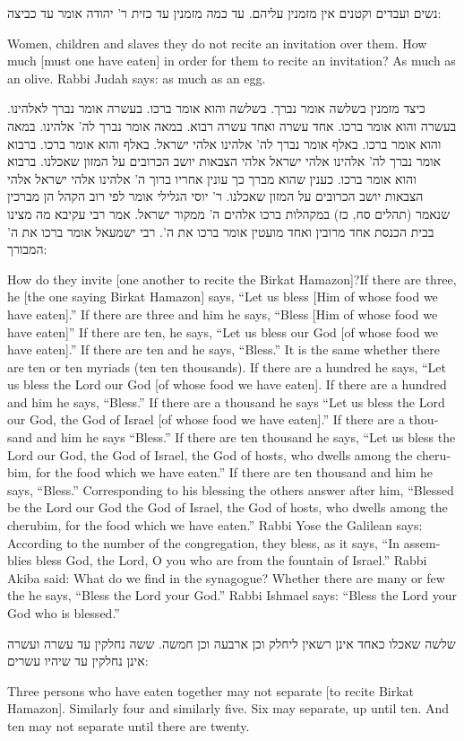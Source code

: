 \documentclass[12pt, openany]{book}
\newcommand{\textblock}[2]{
	{\fontsize{16pt}{20pt}\selectfont #1\\}
	
	\begin{english}
		#2
	\end{english}
	\clearpage
}
\begin{document}
\textblock{נשים ועבדים וקטנים אין מזמנין עליהם. עד כמה מזמנין עד כזית ר' יהודה אומר עד כביצה: }{Women, children and slaves they do not recite an invitation over them. How much {[must one have eaten]} in order for them to recite an invitation? As much as an olive. Rabbi Judah says:  as much as an egg.}
\textblock{כיצד מזמנין בשלשה אומר נברך. בשלשה והוא אומר ברכו. בעשרה אומר נברך לאלהינו. בעשרה והוא אומר ברכו. אחד עשרה ואחד עשרה רבוא. במאה אומר נברך לה' אלהינו. במאה והוא אומר ברכו. באלף אומר נברך לה' אלהינו אלהי ישראל. באלף והוא אומר ברכו. ברבוא אומר נברך לה' אלהינו אלהי ישראל אלהי הצבאות יושב הכרובים על המזון שאכלנו. ברבוא והוא אומר ברכו. כענין שהוא מברך כך עונין אחריו ברוך ה' אלהינו אלהי ישראל אלהי הצבאות יושב הכרובים על המזון שאכלנו. ר' יוסי הגלילי אומר לפי רוב הקהל הן מברכין שנאמר (תהלים סח, כז) במקהלות ברכו אלהים ה' ממקור ישראל. אמר רבי עקיבא מה מצינו בבית הכנסת אחד מרובין ואחד מועטין אומר ברכו את ה'. רבי ישמעאל אומר ברכו את ה' המבורך: }{How do they invite {[one another to recite the Birkat Hamazon]}?If there are three, he {[the one saying Birkat Hamazon]} says, “Let us bless {[Him of whose food we have eaten]}.” If there are three and him he says, “Bless {[Him of whose food we have eaten]}” If there are ten, he says, “Let us bless our God {[of whose food we have eaten]}.” If there are ten and he says, “Bless.” It is the same whether there are ten or ten myriads (ten ten thousands). If there are a hundred he says, “Let us bless the Lord our God {[of whose food we have eaten]}. If there are a hundred and him he says, “Bless.” If there are a thousand he says “Let us bless the Lord our God, the God of Israel {[of whose food we have eaten]}.” If there are a thousand and him he says “Bless.” If there are ten thousand he says, “Let us bless the Lord our God, the God of Israel, the God of hosts, who dwells among the cherubim, for the food which we have eaten.” If there are ten thousand and him he says, “Bless.” Corresponding to his blessing the others answer after him, “Blessed be the Lord our God the God of Israel, the God of hosts, who dwells among the cherubim, for the food which we have eaten.” Rabbi Yose the Galilean says: According to the number of the congregation, they bless, as it says, “In assemblies bless God, the Lord, O you who are from the fountain of Israel.” Rabbi Akiba said: What do we find in the synagogue? Whether there are many or few the he says, “Bless the Lord your God.” Rabbi Ishmael says: “Bless the Lord your God who is blessed.”}
\textblock{שלשה שאכלו כאחד אינן רשאין ליחלק וכן ארבעה וכן חמשה. ששה נחלקין עד עשרה ועשרה אינן נחלקין עד שיהיו עשרים: }{Three persons who have eaten together may not separate {[to recite Birkat Hamazon]}. Similarly four and similarly five. Six may separate, up until ten. And ten may not separate until there are twenty.}
\end{document}
